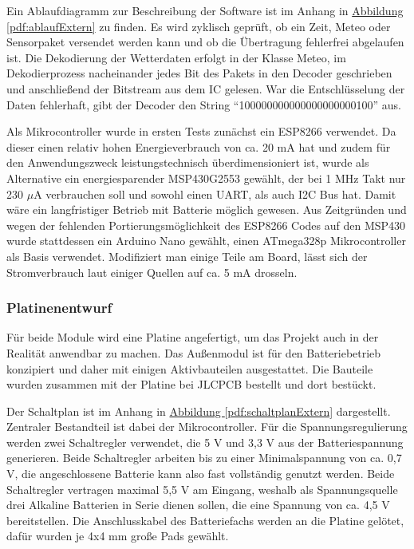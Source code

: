 \documentclass[a4paper,11pt]{article}
\newcounter{subsubsubsection}[subsubsection]
\begin{document}
\vspace{0.2cm}
\noindent
Ein Ablaufdiagramm zur Beschreibung der Software ist im Anhang in \hyperref[pdf:ablaufExtern]{Abbildung \ref{pdf:ablaufExtern}} zu finden. Es wird zyklisch geprüft, ob ein Zeit, Meteo oder Sensorpaket
versendet werden kann und ob die Übertragung fehlerfrei abgelaufen ist. Die Dekodierung der Wetterdaten erfolgt in der Klasse Meteo, im Dekodierprozess nacheinander
jedes Bit des Pakets in den Decoder geschrieben und anschließend der Bitstream aus dem IC gelesen. War die Entschlüsselung der Daten fehlerhaft, gibt der Decoder den String
``100000000000000000000100'' aus. 

\vspace{0.2cm}
\noindent
Als Mikrocontroller wurde in ersten Tests zunächst ein ESP8266 verwendet. Da dieser einen relativ hohen Energieverbrauch von ca. 20 mA hat und zudem für
den Anwendungszweck leistungstechnisch überdimensioniert ist, wurde als Alternative ein energiesparender MSP430G2553 gewählt, der bei 1 MHz Takt nur
230 $\mu$A verbrauchen soll und sowohl einen UART, als auch I2C Bus hat. Damit wäre ein langfristiger Betrieb mit Batterie möglich gewesen. 
Aus Zeitgründen und wegen der fehlenden Portierungsmöglichkeit des ESP8266 Codes auf den MSP430 wurde stattdessen ein Arduino Nano gewählt, einen ATmega328p
Mikrocontroller als Basis verwendet. Modifiziert man einige Teile am Board, lässt sich der Stromverbrauch laut einiger Quellen auf ca. 5 mA drosseln. 

\subsubsection{Platinenentwurf}
\label{subsubsub:platinenentwurfExtern}

Für beide Module wird eine Platine angefertigt, um das Projekt auch in der Realität anwendbar zu machen. Das Außenmodul ist für den Batteriebetrieb konzipiert
und daher mit einigen Aktivbauteilen ausgestattet. Die Bauteile wurden zusammen mit der Platine bei JLCPCB bestellt und dort bestückt. 

\label{subsubsubsub:schaltplanExtern}

Der Schaltplan ist im Anhang in \hyperref[pdf:schaltplanExtern]{Abbildung \ref{pdf:schaltplanExtern}} dargestellt. Zentraler Bestandteil ist dabei der Mikrocontroller. 
Für die Spannungsregulierung werden zwei Schaltregler verwendet, die 5 V und 3,3 V aus der Batteriespannung generieren. Beide Schaltregler arbeiten bis zu einer Minimalspannung
von ca. 0,7 V, die angeschlossene Batterie kann also fast vollständig genutzt werden. Beide Schaltregler vertragen maximal 5,5 V am Eingang, weshalb als Spannungsquelle
drei Alkaline Batterien in Serie dienen sollen, die eine Spannung von ca. 4,5 V bereitstellen. 
Die Anschlusskabel des Batteriefachs werden an die Platine gelötet, dafür wurden je 4x4 mm große Pads gewählt. 
\end{document}
